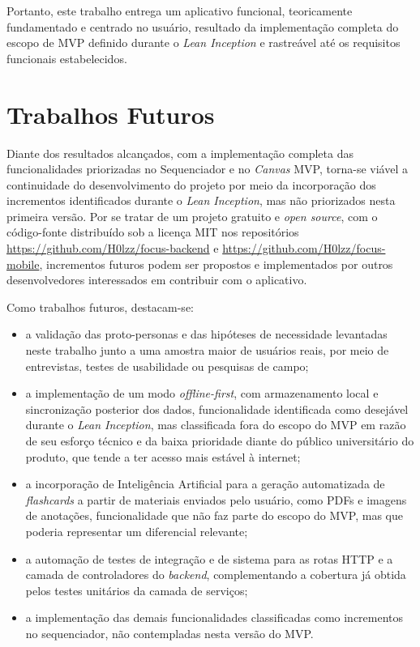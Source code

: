 Portanto, este trabalho entrega um aplicativo funcional, teoricamente fundamentado e centrado no usuário, resultado da implementação completa do escopo de MVP definido durante o \textit{Lean Inception} e rastreável até os requisitos funcionais estabelecidos.

\section{Trabalhos Futuros}
\label{sec:trabalhos_futuros}

Diante dos resultados alcançados, com a implementação completa das funcionalidades priorizadas no Sequenciador e no \textit{Canvas} MVP, torna-se viável a continuidade do desenvolvimento do projeto por meio da incorporação dos incrementos identificados durante o \textit{Lean Inception}, mas não priorizados nesta primeira versão.
Por se tratar de um projeto gratuito e \textit{open source}, com o código-fonte distribuído sob a licença MIT nos repositórios \url{https://github.com/H0lzz/focus-backend} e \url{https://github.com/H0lzz/focus-mobile}, incrementos futuros podem ser propostos e implementados por outros desenvolvedores interessados em contribuir com o aplicativo.

Como trabalhos futuros, destacam-se:

\begin{itemize}
    \item a validação das proto-personas e das hipóteses de necessidade levantadas neste trabalho junto a uma amostra maior de usuários reais, por meio de entrevistas, testes de usabilidade ou pesquisas de campo;
    \item a implementação de um modo \textit{offline-first}, com armazenamento local e sincronização posterior dos dados, funcionalidade identificada como desejável durante o \textit{Lean Inception}, mas classificada fora do escopo do MVP em razão de seu esforço técnico e da baixa prioridade diante do público universitário do produto, que tende a ter acesso mais estável à internet;
    \item a incorporação de Inteligência Artificial para a geração automatizada de \textit{flashcards} a partir de materiais enviados pelo usuário, como PDFs e imagens de anotações, funcionalidade que não faz parte do escopo do MVP, mas que poderia representar um diferencial relevante;
    \item a automação de testes de integração e de sistema para as rotas HTTP e a camada de controladores do \textit{backend}, complementando a cobertura já obtida pelos testes unitários da camada de serviços;
    \item a implementação das demais funcionalidades classificadas como incrementos no sequenciador, não contempladas nesta versão do MVP.
\end{itemize}
